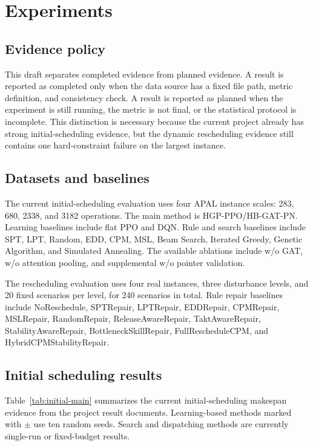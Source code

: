 \section{Experiments}
\label{sec:experiments}

\subsection{Evidence policy}

This draft separates completed evidence from planned evidence. A result is reported as completed only when the data source has a fixed file path, metric definition, and consistency check. A result is reported as planned when the experiment is still running, the metric is not final, or the statistical protocol is incomplete. This distinction is necessary because the current project already has strong initial-scheduling evidence, but the dynamic rescheduling evidence still contains one hard-constraint failure on the largest instance.

\subsection{Datasets and baselines}

The current initial-scheduling evaluation uses four APAL instance scales: 283, 680, 2338, and 3182 operations. The main method is HGP-PPO/HB-GAT-PN. Learning baselines include flat PPO and DQN. Rule and search baselines include SPT, LPT, Random, EDD, CPM, MSL, Beam Search, Iterated Greedy, Genetic Algorithm, and Simulated Annealing. The available ablations include w/o GAT, w/o attention pooling, and supplemental w/o pointer validation.

The rescheduling evaluation uses four real instances, three disturbance levels, and 20 fixed scenarios per level, for 240 scenarios in total. Rule repair baselines include NoReschedule, SPTRepair, LPTRepair, EDDRepair, CPMRepair, MSLRepair, RandomRepair, ReleaseAwareRepair, TaktAwareRepair, StabilityAwareRepair, BottleneckSkillRepair, FullRescheduleCPM, and HybridCPMStabilityRepair.

\subsection{Initial scheduling results}

Table~\ref{tab:initial-main} summarizes the current initial-scheduling makespan evidence from the project result documents. Learning-based methods marked with $\pm$ use ten random seeds. Search and dispatching methods are currently single-run or fixed-budget results.

